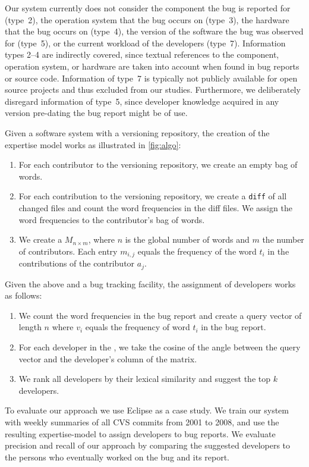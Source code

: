 Our system currently does not consider the component the bug is reported for (type~2), the operation system that the bug occurs on (type~3), the hardware that the bug occurs on (type~4), the version of the software the bug was observed for (type~5), or the current workload of the developers (type~7). Information types 2--4 are indirectly covered, since textual references to the component, operation system, or hardware are taken into account when found in bug reports or source code. Information of type~7 is typically not publicly available for open source projects and thus excluded from our studies. Furthermore, we deliberately disregard information of type~5, since developer knowledge acquired in any version pre-dating the bug report might be of use. 

Given a software system with a versioning repository, the creation of the expertise model works as illustrated in \autoref{fig:algo}:

\begin{enumerate}
\item For each contributor to the versioning repository, we create an empty bag of words. 
\item For each contribution to the versioning repository, we create a \verb$diff$ of all changed files and count the word frequencies in the diff files. We assign the word frequencies to the contributor's bag of words.
\item We create a \TAM $M_{n \times m}$, where $n$ is the global number of words and $m$ the number of contributors. Each entry $m_{i,j}$ equals the frequency of the word $t_i$ in the contributions of the contributor $a_j$. 
\end{enumerate}

Given the above \TAM and a bug tracking facility, the assignment of developers works as follows:

\begin{enumerate}
\item We count the word frequencies in the bug report and create a query vector of length $n$ where $v_i$ equals the frequency of word $t_i$ in the bug report. 
\item For each developer in the \TAM, we take the cosine of the angle between the query vector and the developer's column of the matrix.
\item We rank all developers by their lexical similarity and suggest the top $k$ developers.
\end{enumerate}

To evaluate our approach we use Eclipse as a case study. We train our system with weekly summaries of all CVS commits from 2001 to 2008, and use the resulting expertise-model to assign developers to bug reports. We evaluate precision and recall of our approach by comparing the suggested developers to the persons who eventually worked on the bug and its report.

